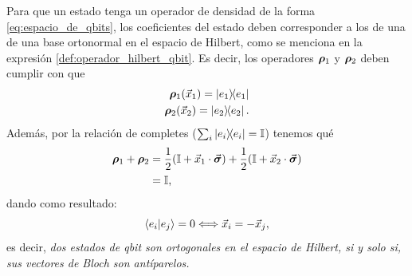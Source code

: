 \documentclass[../Main.tex]{subfiles}
\begin{document}
Para que un estado tenga un operador de densidad de la forma \eqref{eq:espacio_de_qbits}, los coeficientes del estado deben corresponder a los de una de una base ortonormal en el espacio de Hilbert, como se menciona en la expresión \eqref{def:operador_hilbert_qbit}. Es decir, los operadores $\bm{\rho}_1$ y $\bm{\rho}_2$ deben cumplir con que
\begin{subequations}
    \begin{align}
            \bm{\rho}_1(\vec{x}_1)=\op{e_1}\\
            \bm{\rho}_2(\vec{x}_2)=\op{e_2}.
    \end{align}
\end{subequations}
Además, por la relación de completes ($\sum_i \op{e_i}=\mathbb{I}$) tenemos qué
\begin{align}
    \bm{\rho}_1+\bm{\rho}_2
    &=
    \frac{1}{2}\qty(\mathbb{I}+\vec{x}_1\cdot\vec{\bm{\sigma}})+\frac{1}{2}\qty(\mathbb{I}+\vec{x}_2\cdot\vec{\bm{\sigma}})\notag\\
    &=\mathbb{I},
\end{align}
dando como resultado: 
\begin{equation}
    \ip{e_i}{e_j}=0\Longleftrightarrow \vec{x}_i=-\vec{x}_j,
\end{equation}
es decir,\emph{ dos estados de qbit son ortogonales en el espacio de Hilbert, si y solo si, sus vectores de Bloch son antíparelos.}
\end{document}
